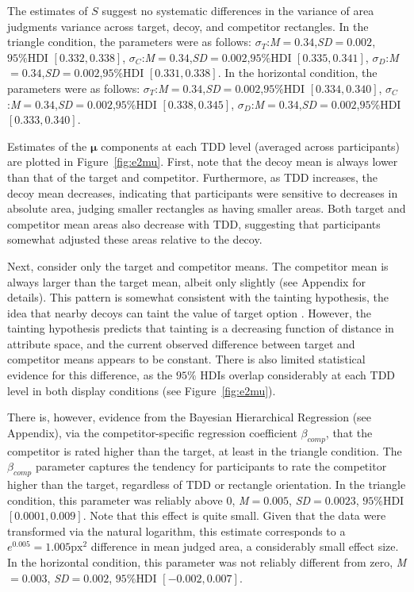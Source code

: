 The estimates of $S$ suggest no systematic differences in the variance of area judgments variance across target, decoy, and competitor rectangles. In the triangle condition, the parameters were as follows: $\sigma_{T}$:\textit{M}$=0.34$,\textit{SD}$=0.002$,$95\%\text{HDI}$ $[0.332,0.338]$, $\sigma_{C}$:\textit{M}$=0.34$,\textit{SD}$=0.002$,$95\%\text{HDI}$ $[0.335,0.341]$, $\sigma_{D}$:\textit{M}$=0.34$,\textit{SD}$=0.002$,$95\%\text{HDI}$ $[0.331,0.338]$. In the horizontal condition, the parameters were as follows: $\sigma_{T}$:\textit{M}$=0.34$,\textit{SD}$=0.002$,$95\%\text{HDI}$ $[0.334,0.340]$, $\sigma_{C}$:\textit{M}$=0.34$,\textit{SD}$=0.002$,$95\%\text{HDI}$ $[0.338,0.345]$, $\sigma_{D}$:\textit{M}$=0.34$,\textit{SD}$=0.002$,$95\%\text{HDI}$ $[0.333,0.340]$. 

Estimates of the $\boldsymbol{\mu}$ components at each TDD level (averaged across participants) are plotted in Figure~\ref{fig:e2mu}. First, note that the decoy mean is always lower than that of the target and competitor. Furthermore, as TDD increases, the decoy mean decreases, indicating that participants were sensitive to decreases in absolute area, judging smaller rectangles as having smaller areas. Both target and competitor mean areas also decrease with TDD, suggesting that participants somewhat adjusted these areas relative to the decoy. 

Next, consider only the target and competitor means. The competitor mean is always larger than the target mean, albeit only slightly (see Appendix for details). This pattern is somewhat consistent with the tainting hypothesis, the idea that nearby decoys can taint the value of target option \parencite{frederick2008attraction,simonson2014vices}. However, the tainting hypothesis predicts that tainting is a decreasing function of distance in attribute space, and the current observed difference between target and competitor means appears to be constant. There is also limited statistical evidence for this difference, as the $95\%$ HDIs overlap considerably at each TDD level in both display conditions (see Figure~\ref{fig:e2mu}). 

There is, however, evidence from the Bayesian Hierarchical Regression (see Appendix), via the competitor-specific regression coefficient $\beta_{comp}$, that the competitor is rated higher than the target, at least in the triangle condition. The $\beta_{comp}$ parameter captures the tendency for participants to rate the competitor higher than the target, regardless of TDD or rectangle orientation. In the triangle condition, this parameter was reliably above 0, \textit{M}$=0.005$, \textit{SD}$=0.0023$, $95\%\text{HDI}$ $[0.0001,0.009]$. Note that this effect is quite small. Given that the data were transformed via the natural logarithm, this estimate corresponds to a $e^{0.005}=1.005\text{px}^2$ difference in mean judged area, a considerably small effect size. In the horizontal condition, this parameter was not reliably different from zero, \textit{M}$=0.003$, \textit{SD}$=0.002$, $95\%\text{HDI}$ $[-0.002,0.007]$. 

